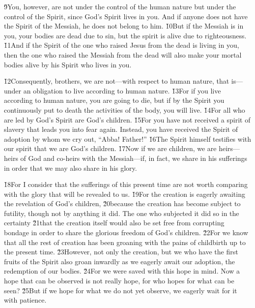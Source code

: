 \v{9}You, however, are not under the control of the human nature but under the control of the Spirit, since God's Spirit lives in you. And if anyone does not have the Spirit of the Messiah, he does not belong to him. \v{10}But if the Messiah is in you, your bodies are dead due to sin, but the spirit is alive due to righteousness. \v{11}And if the Spirit of the one who raised Jesus from the dead is living in you, then the one who raised the Messiah from the dead will also make your mortal bodies alive by his Spirit who lives in you.

\v{12}Consequently, brothers, we are not---with respect to human nature, that is---under an obligation to live according to human nature. \v{13}For if you live according to human nature, you are going to die, but if by the Spirit you continuously put to death the activities of the body, you will live. \v{14}For all who are led by God's Spirit are God's children. \v{15}For you have not received a spirit of slavery that leads you into fear again. Instead, you have received the Spirit of adoption by whom we cry out, ``Abba! Father!'' \v{16}The Spirit himself testifies with our spirit that we are God's children. \v{17}Now if we are children, we are heirs---heirs of God and co-heirs with the Messiah---if, in fact, we share in his sufferings in order that we may also share in his glory.

\v{18}For I consider that the sufferings of this present time are not worth comparing with the glory that will be revealed to us. \v{19}For the creation is eagerly awaiting the revelation of God's children, \v{20}because the creation has become subject to futility, though not by anything it did. The one who subjected it did so in the certainty \v{21}that the creation itself would also be set free from corrupting bondage in order to share the glorious freedom of God's children. \v{22}For we know that all the rest of creation has been groaning with the pains of childbirth up to the present time. \v{23}However, not only the creation, but we who have the first fruits of the Spirit also groan inwardly as we eagerly await our adoption, the redemption of our bodies. \v{24}For we were saved with this hope in mind. Now a hope that can be observed is not really hope, for who hopes for what can be seen? \v{25}But if we hope for what we do not yet observe, we eagerly wait for it with patience.

